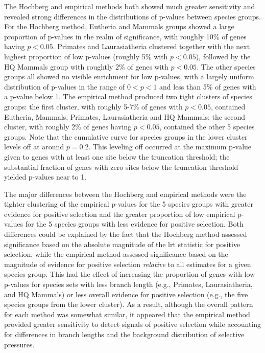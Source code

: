 The Hochberg and empirical methods both showed much greater
sensitivity and revealed strong differences in the distributions of
p-values between species groups. For the Hochberg method, Eutheria and
Mammals groups showed a large proportion of p-values in the realm of
significance, with roughly 10\% of genes having $p<0.05$. Primates and
Laurasiatheria clustered together with the next highest proportion of
low p-values (roughly 5\% with $p<0.05$), followed by the HQ Mammals
group with roughtly 2\% of genes with $p<0.05$. The other species
groups all showed no visible enrichment for low p-values, with a
largely uniform distribution of p-values in the range of $0<p<1$ and
less than 5\% of genes with a p-value below 1. The empirical method
produced two tight clusters of species groups: the first cluster, with
roughly 5-7\% of genes with $p<0.05$, contained Eutheria, Mammals,
Primates, Laurasiatheria and HQ Mammals; the second cluster, with
roughly 2\% of genes having $p<0.05$, contained the other 5 species
groups. Note that the cumulative curve for species groups in the lower
cluster levels off at around $p=0.2$. This leveling off occurred at
the maximum p-value given to genes with at least one site below the
truncation threshold; the substantial fraction of genes with zero
sites below the truncation threshold yielded p-values near to 1.

The major differences between the Hochberg and empirical methods were
the tighter clustering of the empirical p-values for the 5 species
groups with greater evidence for positive selection and the greater
proportion of low empirical p-values for the 5 species groups with
less evidence for positive selection. Both differences could be
explained by the fact that the Hochberg method assessed significance
based on the absolute magnitude of the \ac{lrt} statistic for positive
selection, while the empirical method assessed significance based on
the magnitude of evidence for positive selection \emph{relative} to
all \sw estimates for a given species group. This had the effect of
increasing the proportion of genes with low p-values for species sets
with less branch length (e.g., Primates, Laurasiatheria, and HQ
Mammals) or less overall evidence for positive selection (e.g., the
five species groups from the lower cluster). As a result, although the
overall pattern for each method was somewhat similar, it appeared that
the empirical method provided greater sensitivity to detect signals of
positive selection while accounting for differences in branch lengths
and the background distribution of \sw selective pressures.


